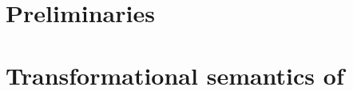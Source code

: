\chapter{Preliminaries}
\label{chp_preliminaries}


\chapter{Transformational semantics of \oz{}}
\label{chp_tra_sem_oz}

